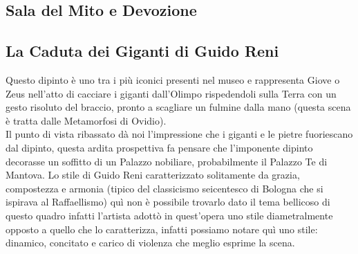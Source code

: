 \documentclass[hidelinks,12pt,a4paper]{article}
\begin{document}
\begin{flushleft}
			\section{Sala del Mito e Devozione}
	
			\subsection{La Caduta dei Giganti di Guido Reni}
			Questo dipinto è uno tra i più iconici presenti nel museo e rappresenta Giove o Zeus nell'atto di cacciare i giganti dall'Olimpo rispedendoli sulla Terra con un gesto risoluto del braccio, pronto a scagliare un fulmine dalla mano (questa scena è tratta dalle Metamorfosi di Ovidio).\\
			Il punto di vista ribassato dà noi l'impressione che i giganti e le pietre fuoriescano dal dipinto, questa ardita prospettiva fa pensare che l'imponente dipinto decorasse un soffitto di un Palazzo nobiliare, probabilmente il Palazzo Te di Mantova. Lo stile di Guido Reni caratterizzato solitamente da grazia, compostezza e armonia (tipico del classicismo seicentesco di Bologna che si ispirava al Raffaellismo) quì non è possibile trovarlo dato il tema bellicoso di questo quadro infatti l'artista adottò in quest'opera uno stile diametralmente opposto a quello che lo caratterizza, infatti possiamo notare quì uno stile: dinamico, concitato e carico di violenza che meglio esprime la scena.
	

\end{flushleft}
\end{document}
